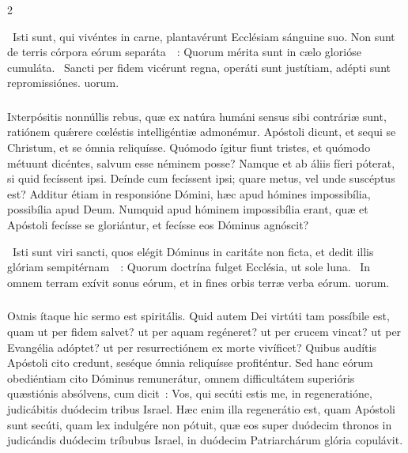 \documentclass[9pt,twoside]{extarticle}
\begin{document}
\begin{multicols}{2}
{{\begin{tightlist}{}
\item {}~Isti sunt, qui vivéntes in carne, plantavérunt Ecclésiam sánguine suo. Non sunt de terris córpora eórum separáta~~: \textred{*} Quorum mérita sunt in cælo glorióse cumuláta. ~Sancti per fidem vicérunt regna, operáti sunt justítiam, adépti sunt repromissiónes. uorum.
\end{tightlist}

\subsubsection*{\center {}}
\lettrine{I}nterpósitis nonnúllis rebus, quæ ex natúra humáni sensus sibi contráriæ sunt, ratiónem quǽrere cœléstis intelligéntiæ admonémur. Apóstoli dicunt, et sequi se Christum, et se ómnia reliquísse. Quómodo ígitur fiunt tristes, et quómodo métuunt dicéntes, salvum esse néminem posse? Namque et ab áliis fíeri póterat, si quid fecíssent ipsi. Deínde cum fecíssent ipsi; quare metus, vel unde suscéptus est? Additur étiam in responsióne Dómini, hæc apud hómines impossibília, possibília apud Deum. Numquid apud hóminem impossibília erant, quæ et Apóstoli fecísse se gloriántur, et fecísse eos Dóminus agnóscit?

\begin{tightlist}{}
\item {}~Isti sunt viri sancti, quos elégit Dóminus in caritáte non ficta, et dedit illis glóriam sempitérnam~~: \textred{*} Quorum doctrína fulget Ecclésia, ut sole luna. ~In omnem terram exívit sonus eórum, et in fines orbis terræ verba eórum. uorum.
\end{tightlist}

\subsubsection*{\center {}}
\lettrine{O}mnis ítaque hic sermo est spiritális. Quid autem Dei virtúti tam possíbile est, quam ut per fidem salvet? ut per aquam regéneret? ut per crucem vincat? ut per Evangélia adóptet? ut per resurrectiónem ex morte vivíficet? Quibus audítis Apóstoli cito credunt, seséque ómnia reliquísse profiténtur. Sed hanc eórum obediéntiam cito Dóminus remunerátur, omnem difficultátem superióris quæstiónis absólvens, cum dicit~: Vos, qui secúti estis me, in regeneratióne, judicábitis duódecim tribus Israel. Hæc enim illa regenerátio est, quam Apóstoli sunt secúti, quam lex indulgére non pótuit, quæ eos super duódecim thronos in judicándis duódecim tríbubus Israel, in duódecim Patriarchárum glória copulávit.

}}
\end{multicols}
\end{document}
